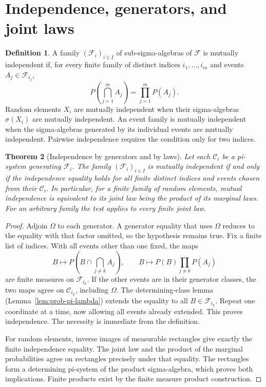 \documentclass[11pt,oneside,openany]{book}
\theoremstyle{plain}
\newtheorem{theorem}{Theorem}[chapter]
\theoremstyle{definition}
\newtheorem{definition}[theorem]{Definition}
\theoremstyle{remark}
\begin{document}
\section{Independence, generators, and joint laws}
\label{p02-01}

\begin{definition}
A family \((\mathcal F_i)_{i\in I}\) of sub-sigma-algebras of
\(\mathcal F\) is mutually independent if, for every finite family of
distinct indices \(i_1,\ldots,i_m\) and events \(A_j\in\mathcal F_{i_j}\),
\[
 P\left(\bigcap_{j=1}^m A_j\right)=\prod_{j=1}^m P(A_j).
\]
Random elements \(X_i\) are mutually independent when their
sigma-algebras \(\sigma(X_i)\) are mutually independent. An event family
is mutually independent when the sigma-algebras generated by its
individual events are mutually independent. Pairwise independence
requires the condition only for two indices.
\end{definition}

\begin{theorem}[Independence by generators and by laws]
\label{thm:prob-independent-laws}
Let each \(\mathcal C_i\) be a pi-system generating \(\mathcal F_i\).
The family \((\mathcal F_i)_{i\in I}\) is mutually independent if and
only if the independence equality holds for all finite distinct
indices and events chosen from their \(\mathcal C_i\).
In particular, for a finite family of random elements, mutual
independence is equivalent to its joint law being the product of
its marginal laws. For an arbitrary family the test applies to every
finite joint law.
\end{theorem}
\begin{proof}
Adjoin \(\Omega\) to each generator. A generator equality that uses
\(\Omega\) reduces to the equality with that factor omitted, so the
hypothesis remains true. Fix a finite list of indices. With all
events other than one fixed, the maps
\[
 B\longmapsto P\left(B\cap\bigcap_{j\ne k} A_j\right),
 \qquad
 B\longmapsto P(B)\prod_{j\ne k} P(A_j)
\]
are finite measures on \(\mathcal F_{i_k}\). If the other events are
in their generator classes, the two maps agree on \(\mathcal C_{i_k}\),
including \(\Omega\). The determining-class lemma
(Lemma~\ref{lem:prob-pi-lambda}) extends the equality to all
\(B\in\mathcal F_{i_k}\). Repeat one coordinate at a time, now allowing
all events already extended. This proves independence. The necessity
is immediate from the definition.

For random elements, inverse images of measurable rectangles give
exactly the finite independence equality. The joint law and the
product of the marginal probabilities agree on rectangles precisely
under that equality. The rectangles form a determining pi-system
of the product sigma-algebra, which proves both implications. Finite
products exist by the finite measure product construction.
\end{proof}
\end{document}
